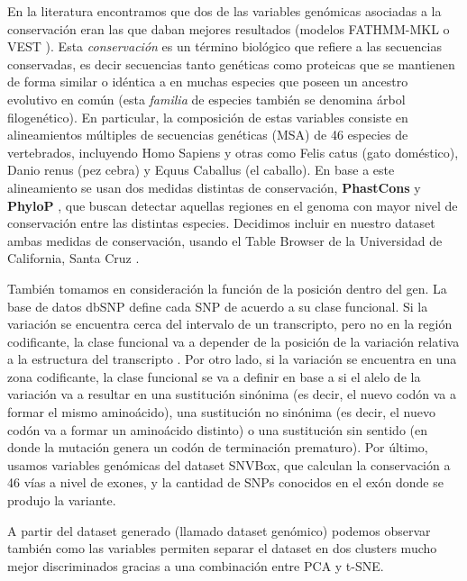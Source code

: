 En la literatura encontramos que dos de las variables genómicas asociadas a la conservación eran las que daban mejores resultados (modelos FATHMM-MKL \cite{Shihab2015} o VEST \cite{Carter2013}). Esta \textit{conservación} es un término biológico que refiere a las secuencias conservadas, es decir secuencias tanto genéticas como proteicas que se mantienen de forma similar o idéntica a en muchas especies que poseen un ancestro evolutivo en común (esta \textit{familia} de especies también se denomina árbol filogenético). En particular, la composición de estas variables consiste en alineamientos múltiples de secuencias genéticas (MSA) de 46 especies de vertebrados, incluyendo Homo Sapiens y otras como Felis catus (gato doméstico), Danio renus (pez cebra) y Equus Caballus (el caballo). En base a este alineamiento se usan dos medidas distintas de conservación, \textbf{PhastCons} \cite{siepel2005evolutionarily} y \textbf{PhyloP} \cite{Pollard2010}, que buscan detectar aquellas regiones en el genoma con mayor nivel de conservación entre las distintas especies. Decidimos incluir en nuestro dataset ambas medidas de conservación, usando el Table Browser de la Universidad de California, Santa Cruz \cite{Karolchik2004}.

También tomamos en consideración la función de la posición dentro del gen. La base de datos dbSNP define cada SNP de acuerdo a su clase funcional. Si la variación se encuentra cerca del intervalo de un transcripto, pero no en la región codificante, la clase funcional va a depender de la posición de la variación relativa a la estructura del transcripto \cite{Ostell2007}. Por otro lado, si la variación se encuentra en una zona codificante, la clase funcional se va a definir en base a si el alelo de la variación va a resultar en una sustitución sinónima (es decir, el nuevo codón va a formar el mismo aminoácido), una sustitución no sinónima (es decir, el nuevo codón va a formar un aminoácido distinto) o una sustitución sin sentido (en donde la mutación genera un codón de terminación prematuro).
Por último, usamos variables genómicas del dataset SNVBox, que calculan la conservación a 46 vías a nivel de exones, y la cantidad de SNPs conocidos en el exón donde se produjo la variante. 


A partir del dataset generado (llamado dataset genómico) podemos observar también como las variables permiten separar el dataset en dos clusters mucho mejor discriminados gracias a una combinación entre PCA y t-SNE.

